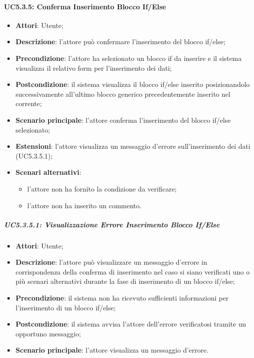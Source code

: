 \paragraph{UC5.3.5: Conferma Inserimento Blocco If/Else}
\label{UC5.3.5}
\begin{itemize}
\item \textbf{Attori}: Utente;
\item \textbf{Descrizione}: l'attore può confermare l'inserimento del blocco if/else;	
\item \textbf{Precondizione}: l'attore ha selezionato un blocco if da inserire e il sistema visualizza il relativo form per l'inserimento dei dati;	
\item \textbf{Postcondizione}: il sistema visualizza il blocco if/else inserito posizionandolo successivamente all'ultimo blocco generico precedentemente inserito nel  corrente;
\item \textbf{Scenario principale}:
l'attore conferma l'inserimento del blocco if/else selezionato;	
\item \textbf{Estensioni}:
l'attore visualizza un messaggio d'errore sull'inserimento dei dati (UC5.3.5.1);	
\item \textbf{Scenari alternativi}:
\begin{itemize}
\item l'attore non ha fornito la condizione da verificare;
\item l'attore non ha inserito un commento.
\end{itemize}
\end{itemize}

\subparagraph{UC5.3.5.1: Visualizzazione Errore Inserimento Blocco If/Else}
\label{UC5.3.5.1}
\begin{itemize}
\item \textbf{Attori}: Utente;
\item \textbf{Descrizione}: l'attore può visualizzare un messaggio d'errore in corrispondenza della conferma di inserimento nel caso si siano verificati uno o più scenari alternativi durante la fase di inserimento di un blocco if/else;	
\item \textbf{Precondizione}: il sistema non ha ricevuto sufficienti informazioni per l'inserimento di un blocco if/else;	
\item \textbf{Postcondizione}: il sistema avvisa l'attore dell'errore verificatosi tramite un opportuno messaggio;	
\item \textbf{Scenario principale}:
l'attore visualizza un messaggio d'errore.	
\end{itemize}

